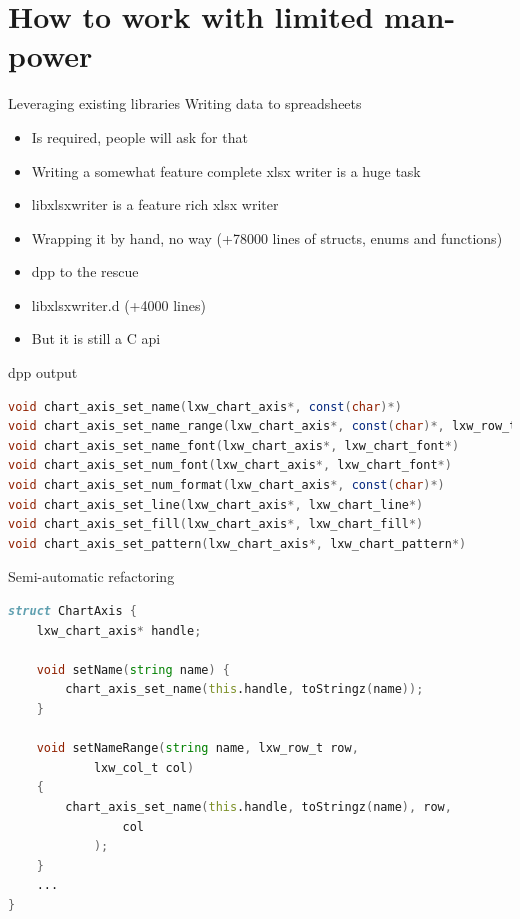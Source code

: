 \documentclass[aspectratio=169,notes]{beamer}
\begin{document}
	\section{How to work with limited man-power}

	\begin{frame}{Leveraging existing libraries}
		\large
		Writing data to spreadsheets
		\pause
		\begin{itemize}
			\item Is required, people will ask for that
			\item Writing a somewhat feature complete xlsx writer is a huge task\\[1cm]
		\end{itemize}
		\begin{itemize}
			\item libxlsxwriter is a feature rich xlsx writer
			\item Wrapping it by hand, \pause no way (+78000 lines of structs, enums and functions)\\[1cm]
			\pause
			\item dpp to the rescue
			\item libxlsxwriter.d (+4000 lines)
			\item But it is still a C api
		\end{itemize}
	\end{frame}

	\begin{frame}[fragile]{dpp output}
		\begin{lstlisting}[language=D,basicstyle=\small\ttfamily]
void chart_axis_set_name(lxw_chart_axis*, const(char)*)
void chart_axis_set_name_range(lxw_chart_axis*, const(char)*, lxw_row_t, lxw_col_t)
void chart_axis_set_name_font(lxw_chart_axis*, lxw_chart_font*)
void chart_axis_set_num_font(lxw_chart_axis*, lxw_chart_font*)
void chart_axis_set_num_format(lxw_chart_axis*, const(char)*)
void chart_axis_set_line(lxw_chart_axis*, lxw_chart_line*)
void chart_axis_set_fill(lxw_chart_axis*, lxw_chart_fill*)
void chart_axis_set_pattern(lxw_chart_axis*, lxw_chart_pattern*)
\end{lstlisting}
	\end{frame}

	\begin{frame}[fragile]{Semi-automatic refactoring}
		\begin{lstlisting}[language=D]
struct ChartAxis {
	lxw_chart_axis* handle;

	void setName(string name) { 
		chart_axis_set_name(this.handle, toStringz(name)); 
	}

	void setNameRange(string name, lxw_row_t row, 
			lxw_col_t col) 
	{
		chart_axis_set_name(this.handle, toStringz(name), row, 
				col
			);
	}
	...
}
\end{lstlisting}
	\end{frame}
\end{document}
